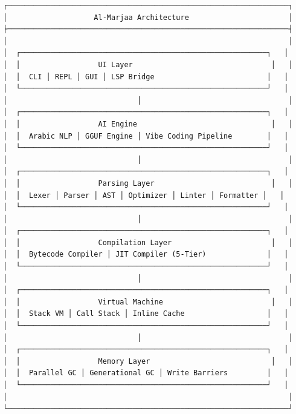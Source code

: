 \documentclass[11pt,a4paper]{article}
\begin{document}
\begin{verbatim}
┌─────────────────────────────────────────────────────────────────┐
│                    Al-Marjaa Architecture                       │
├─────────────────────────────────────────────────────────────────┤
│                                                                 │
│  ┌─────────────────────────────────────────────────────────┐   │
│  │                  UI Layer                                │   │
│  │  CLI │ REPL │ GUI │ LSP Bridge                          │   │
│  └─────────────────────────────────────────────────────────┘   │
│                              │                                  │
│  ┌─────────────────────────────────────────────────────────┐   │
│  │                  AI Engine                               │   │
│  │  Arabic NLP │ GGUF Engine │ Vibe Coding Pipeline        │   │
│  └─────────────────────────────────────────────────────────┘   │
│                              │                                  │
│  ┌─────────────────────────────────────────────────────────┐   │
│  │                  Parsing Layer                           │   │
│  │  Lexer │ Parser │ AST │ Optimizer │ Linter │ Formatter │   │
│  └─────────────────────────────────────────────────────────┘   │
│                              │                                  │
│  ┌─────────────────────────────────────────────────────────┐   │
│  │                  Compilation Layer                       │   │
│  │  Bytecode Compiler │ JIT Compiler (5-Tier)              │   │
│  └─────────────────────────────────────────────────────────┘   │
│                              │                                  │
│  ┌─────────────────────────────────────────────────────────┐   │
│  │                  Virtual Machine                         │   │
│  │  Stack VM │ Call Stack │ Inline Cache                   │   │
│  └─────────────────────────────────────────────────────────┘   │
│                              │                                  │
│  ┌─────────────────────────────────────────────────────────┐   │
│  │                  Memory Layer                            │   │
│  │  Parallel GC │ Generational GC │ Write Barriers         │   │
│  └─────────────────────────────────────────────────────────┘   │
│                                                                 │
└─────────────────────────────────────────────────────────────────┘
\end{verbatim}

\end{document}
